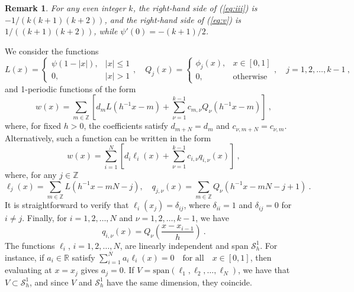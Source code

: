 \documentclass{amsart}
\newtheorem{remark}{Remark}[section]
\begin{document}
\begin{remark}\label{rmk:onepone}
For any even integer $k$, the right-hand side of (\ref{eq:iii}) is $-1/(k(k+1)(k+2))$, and the right-hand side of (\ref{eq:v}) is $1/((k+1)(k+2))$, while $\psi'(0)=-(k+1)/2$. 
\end{remark}


We consider the functions
%
{\footnotesize 
$$L(x)=\left\{
\begin{array}{ll} 
\psi(1-|x|), & |x|\leq 1\\
0, & |x|>1
\end{array}
\right. ,\quad
Q_j(x)=\left\{\begin{array}{ll}
\phi_j(x), &  x\in[0,1]\\
0,  &\text{otherwise}
\end{array}
\right. ,\quad j=1,2,\dots, k-1\ , 
$$
}
%
and 1-periodic functions of the form
$$w(x)=\sum_{m\in\mathbb{Z}} \left[d_mL(h^{-1}x-m)+\sum_{\nu=1}^{k-1} c_{m,\nu}Q_\nu(h^{-1}x-m) \right]\ ,$$
where, for fixed $h>0$, the coefficients satisfy $d_{m+N}=d_m$ and $c_{\nu,m+N}=c_{\nu,m}$. 
%
Alternatively, such a function can be written in the form
$$w(x)=\sum_{i=1}^N\left[ d_i \ell_i(x)+\sum_{\nu=1}^{k-1}c_{i,\nu} q_{i,\nu}(x)\right]\ ,$$
where, for any $j\in\mathbb{Z}$ 
$$\ell_j(x)=\sum_{m\in\mathbb{Z}} L(h^{-1}x-mN-j),\quad q_{j,\nu}(x)=\sum_{m\in\mathbb{Z}} Q_\nu(h^{-1}x-mN-j+1)\ .$$
%
It is straightforward to verify that $\ell_i(x_j)=\delta_{ij}$, where $\delta_{ii}=1$ and $\delta_{ij}=0$ for $i\not=j$. 
%
Finally, for $i=1,2,\dots, N$ and $\nu=1,2,\dots, k-1$, we have
$$q_{i,\nu}(x)=Q_\nu\left(\frac{x-x_{i-1}}{h} \right)\ .$$
The functions $\ell_i$, $i=1,2,\dots, N$, are linearly independent and span $\mathcal{S}_h^1$. For instance, if $a_i\in \mathbb{R}$ satisfy
$\sum_{i=1}^N a_i \ell_i(x)=0\quad \text{for all}\quad x\in[0,1]$,
then evaluating at $x=x_j$ gives $a_j=0$. If $V=\mathrm{span}(\ell_1,\ell_2,\dots,\ell_N)$, we have that $V\subset \mathcal{S}_h^1$, and since $V$ and $\mathcal{S}_h^1$ have the same dimension, they coincide.
\end{document}
